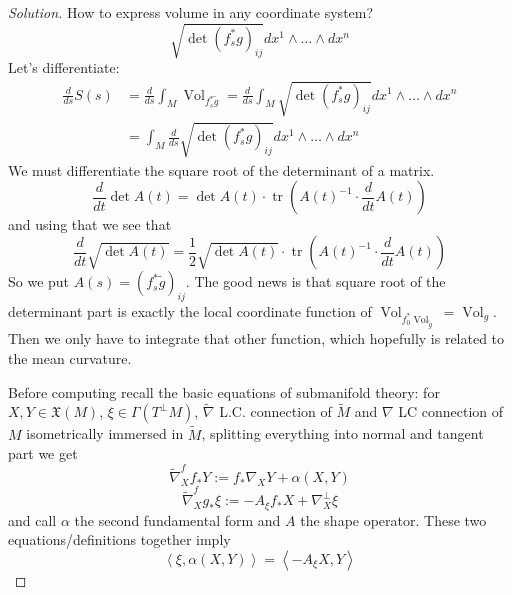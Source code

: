 \begin{proof}[Solution]\leavevmode
How to express volume in any coordinate system?
\[\sqrt{\det (f^* _sg)_{ij}}dx^1\wedge\ldots\wedge dx^n\]
Let's differentiate:
\begin{align*}
	\frac{d}{ds}S(s)&=\frac{d}{ds}\int_M\operatorname{Vol}_{f^*_s\tilde{g}}=\frac{d}{ds}\int_M \sqrt{\det (f^* _sg)_{ij}}dx^1\wedge\ldots\wedge dx^n\\
&=\int_M \frac{d}{ds}\sqrt{\det (f^* _sg)_{ij}}dx^1\wedge\ldots\wedge dx^n
\end{align*}
We must differentiate the square root of the determinant of a matrix. 
\[\boxed{\frac{d}{dt}\det A(t)=\det A(t) \cdot \operatorname{tr}\left(A(t)^{-1}\cdot \frac{d}{dt}A(t)\right)}\]
and using that we see that
\[\boxed{\frac{d}{dt}\sqrt{\det A(t)} =\frac{1}{2}\sqrt{\det A(t)} \cdot\operatorname{tr}\left(A(t)^{-1}\cdot \frac{d}{dt}A(t)\right) }\]
So we put \(A(s)=(f^*_s\tilde{g})_{ij}\). The good news is that square root of the determinant part is exactly the local coordinate function of \(\operatorname{Vol}_{f_0^*\operatorname{Vol}_{\tilde{g}}}=\operatorname{Vol}_g\). Then we only have to integrate that other function, which hopefully is related to the mean curvature.

Before computing recall the basic equations of submanifold theory: for \(X,Y \in \mathfrak{X}(M)\), \(\xi \in \Gamma(T^\perp M)\), \(\tilde{\nabla}\) L.C. connection of \(\tilde{M}\) and \(\nabla\) LC connection of \(M\) isometrically immersed in  \(\tilde{M}\), splitting everything into normal and tangent part we get
\[\boxed{\tilde{\nabla}^f_Xf_*Y:=f_*\nabla_XY+\alpha(X,Y)}\]
\[\boxed{\tilde{\nabla}_X^f g_*\xi:=-A_\xi f_*X+\nabla^\perp_X\xi}\]
and call \(\alpha\) the second fundamental form and \(A\) the shape operator. These two equations/definitions together imply
\[\boxed{\left<\xi,\alpha(X,Y)\right>=\left<-A_\xi X,Y\right>}\]



\end{proof}

